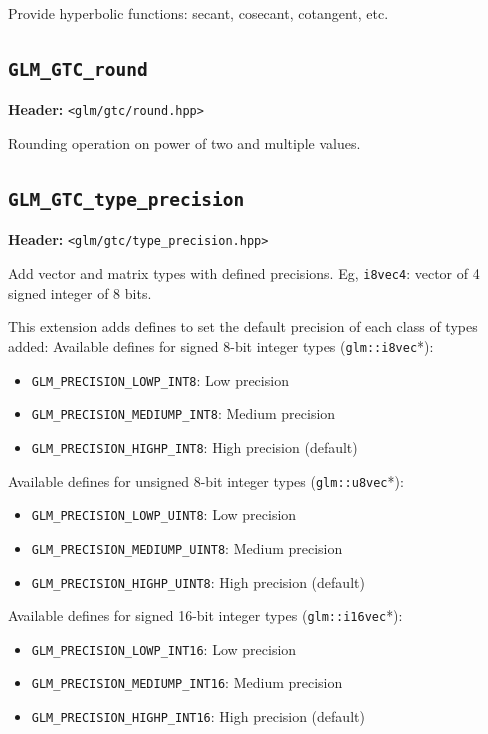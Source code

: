 \documentclass{scrartcl}
\numberwithin{figure}{subsection}
\begin{document}
Provide hyperbolic functions: secant, cosecant, cotangent, etc.

\subsection{\texttt{GLM\_GTC\_round}}
\textbf{Header:} \verb|<glm/gtc/round.hpp>|

Rounding operation on power of two and multiple values.


\subsection{\texttt{GLM\_GTC\_type\_precision}}
\textbf{Header:} \verb|<glm/gtc/type_precision.hpp>|

Add vector and matrix types with defined precisions. Eg, \verb|i8vec4|: vector of 4 signed integer of 8 bits.

This extension adds defines to set the default precision of each class of types added:
Available defines for signed 8-bit integer types (\verb|glm::i8vec|*):

\begin{itemize}
    \item \verb|GLM_PRECISION_LOWP_INT8|: Low precision
    \item \verb|GLM_PRECISION_MEDIUMP_INT8|: Medium precision 
    \item \verb|GLM_PRECISION_HIGHP_INT8|: High precision (default)
\end{itemize}

Available defines for unsigned 8-bit integer types (\verb|glm::u8vec|*):

\begin{itemize}
    \item \verb|GLM_PRECISION_LOWP_UINT8|: Low precision
    \item \verb|GLM_PRECISION_MEDIUMP_UINT8|: Medium precision 
    \item \verb|GLM_PRECISION_HIGHP_UINT8|: High precision (default)
\end{itemize}

Available defines for signed 16-bit integer types (\verb|glm::i16vec|*):

\begin{itemize}
    \item \verb|GLM_PRECISION_LOWP_INT16|: Low precision
    \item \verb|GLM_PRECISION_MEDIUMP_INT16|: Medium precision 
    \item \verb|GLM_PRECISION_HIGHP_INT16|: High precision (default)
\end{itemize}
\end{document}
